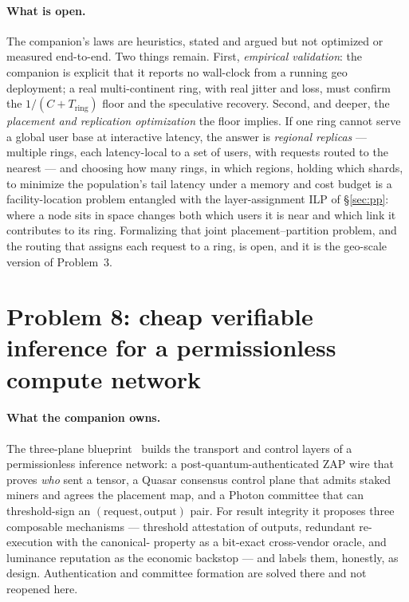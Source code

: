 \documentclass[11pt]{article}
\newcommand{\Tring}{\ensuremath{T_{\mathrm{ring}}}}
\begin{document}
\paragraph{What is open.} The companion's laws are heuristics, stated and argued but not optimized or
measured end-to-end. Two things remain. First, \emph{empirical validation}: the companion is explicit that
it reports no wall-clock from a running geo deployment; a real multi-continent ring, with real jitter and
loss, must confirm the $1/(C+\Tring)$ floor and the speculative recovery. Second, and deeper, the
\emph{placement and replication optimization} the floor implies. If one ring cannot serve a global user
base at interactive latency, the answer is \emph{regional replicas} --- multiple rings, each latency-local
to a set of users, with requests routed to the nearest --- and choosing how many rings, in which regions,
holding which shards, to minimize the population's tail latency under a memory and cost budget is a
facility-location problem entangled with the layer-assignment ILP of \S\ref{sec:pp}: where a node sits in
space changes both which users it is near and which link it contributes to its ring. Formalizing that
joint placement--partition problem, and the routing that assigns each request to a ring, is open, and it is
the geo-scale version of Problem~3.

\section{Problem 8: cheap verifiable inference for a permissionless compute network}
\label{sec:verify}

\paragraph{What the companion owns.} The three-plane blueprint~\cite{consensus} builds the transport and
control layers of a permissionless inference network: a post-quantum-authenticated ZAP wire that proves
\emph{who} sent a tensor, a Quasar consensus control plane that admits staked miners and agrees the
placement map, and a Photon committee that can threshold-sign an $(\text{request},\text{output})$ pair.
For result integrity it proposes three composable mechanisms --- threshold attestation of outputs,
redundant re-execution with the canonical- property as a bit-exact cross-vendor oracle, and
luminance reputation as the economic backstop --- and labels them, honestly, as design. Authentication and
committee formation are solved there and not reopened here.
\end{document}
